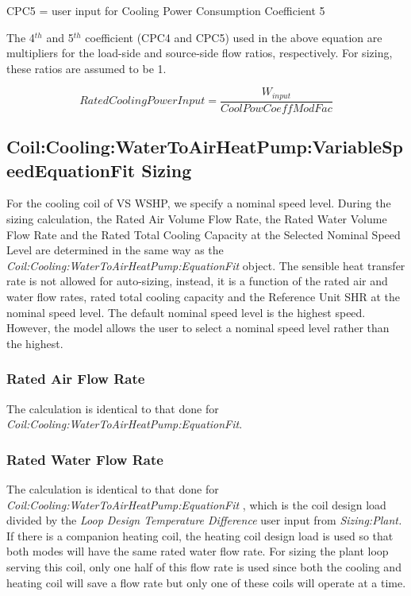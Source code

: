 CPC5 = user input for Cooling Power Consumption Coefficient 5


The 4\(^{th}\) and 5\(^{th}\) coefficient (CPC4 and CPC5) used in the above equation are multipliers for the load-side and source-side flow ratios, respectively. For sizing, these ratios are assumed to be 1.


\begin{equation}
   {Rated Cooling Power Input} = \frac{{W}_{input}}{CoolPowCoeffModFac} 
\end{equation}



\subsection{Coil:Cooling:WaterToAirHeatPump:VariableSpeedEquationFit Sizing}\label{coilcoolingwatertoairheatpumpvariablespeedequationfit-sizing}

For the cooling coil of VS WSHP, we specify a nominal speed level. During the sizing calculation, the Rated Air Volume Flow Rate, the Rated Water Volume Flow Rate and the Rated Total Cooling Capacity at the Selected Nominal Speed Level are determined in the same way as the \emph{Coil:Cooling:WaterToAirHeatPump:EquationFit} object. The sensible heat transfer rate is not allowed for auto-sizing, instead, it is a function of the rated air and water flow rates, rated total cooling capacity and the Reference Unit SHR at the nominal speed level. The default nominal speed level is the highest speed. However, the model allows the user to select a nominal speed level rather than the highest.

\subsubsection{Rated Air Flow Rate}\label{rated-air-flow-rate-1}

The calculation is identical to that done for \emph{Coil:Cooling:WaterToAirHeatPump:EquationFit}.

\subsubsection{Rated Water Flow Rate}\label{rated-water-flow-rate-1}

The calculation is identical to that done for \emph{Coil:Cooling:WaterToAirHeatPump:EquationFit} , which is the coil design load divided by the \emph{Loop Design Temperature Difference} user input from \emph{Sizing:Plant.} If there is a companion heating coil, the heating coil design load is used so that both modes will have the same rated water flow rate. For sizing the plant loop serving this coil, only one half of this flow rate is used since both the cooling and heating coil will save a flow rate but only one of these coils will operate at a time.

